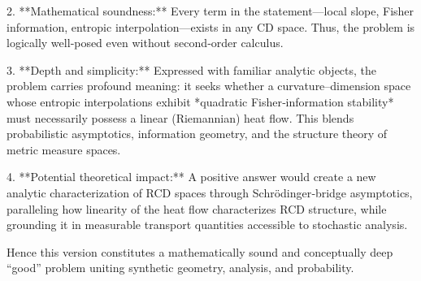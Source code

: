 2. **Mathematical soundness:**  
   Every term in the statement—local slope, Fisher information, entropic interpolation—exists in any CD space. Thus, the problem is logically well‑posed even without second‑order calculus.  

3. **Depth and simplicity:**  
   Expressed with familiar analytic objects, the problem carries profound meaning: it seeks whether a curvature–dimension space whose entropic interpolations exhibit *quadratic Fisher‑information stability* must necessarily possess a linear (Riemannian) heat flow. This blends probabilistic asymptotics, information geometry, and the structure theory of metric measure spaces.  

4. **Potential theoretical impact:**  
   A positive answer would create a new analytic characterization of RCD spaces through Schrödinger‑bridge asymptotics, paralleling how linearity of the heat flow characterizes RCD structure, while grounding it in measurable transport quantities accessible to stochastic analysis.  

Hence this version constitutes a mathematically sound and conceptually deep “good” problem uniting synthetic geometry, analysis, and probability.